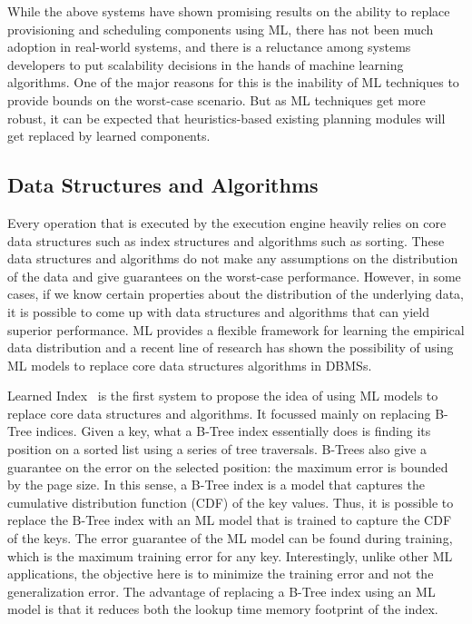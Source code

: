 While the above systems have shown promising results on the ability to replace provisioning and scheduling components using ML, there has not been much adoption in real-world systems, and there is a reluctance among systems developers to put scalability decisions in the hands of machine learning algorithms.
One of the major reasons for this is the inability of ML techniques to provide bounds on the worst-case scenario.
But as ML techniques get more robust, it can be expected that heuristics-based existing planning modules will get replaced by learned components.

\subsection{Data Structures and Algorithms}
Every operation that is executed by the execution engine heavily relies on core data structures such as index structures and algorithms such as sorting.
These data structures and algorithms do not make any assumptions on the distribution of the data and give guarantees on the worst-case performance.
However, in some cases, if we know certain properties about the distribution of the underlying data, it is possible to come up with data structures and algorithms that can yield superior performance.
ML provides a flexible framework for learning the empirical data distribution and a recent line of research has shown the possibility of using ML models to replace core data structures algorithms in DBMSs.

Learned Index~\cite{learnedindex} is the first system to propose the idea of using ML models to replace core data structures and algorithms. It focussed mainly on replacing B-Tree indices. 
Given a key, what a B-Tree index essentially does is finding its position on a sorted list using a series of tree traversals.
B-Trees also give a guarantee on the error on the selected position: the maximum error is bounded by the page size.
In this sense, a B-Tree index is a model that captures the cumulative distribution function (CDF) of the key values.
Thus, it is possible to replace the B-Tree index with an ML model that is trained to capture the CDF of the keys.
The error guarantee of the ML model can be found during training, which is the maximum training error for any key.
Interestingly, unlike other ML applications, the objective here is to minimize the training error and not the generalization error.
The advantage of replacing a B-Tree index using an ML model is that it reduces both the lookup time memory footprint of the index.

